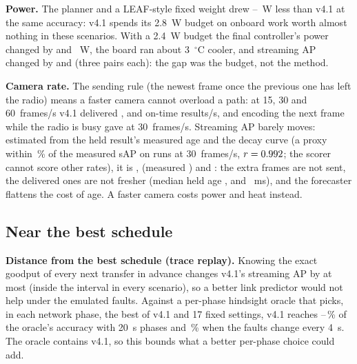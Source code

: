 \documentclass[conference]{IEEEtran}
\begin{document}
\textbf{Power.} The planner and a LEAF-style fixed weight drew \BdLessWMin--\BdLessWMax~W less than v4.1 at the same
accuracy: v4.1 spends its 2.8~W budget on onboard work worth almost nothing in these scenarios. With a 2.4~W budget the
final controller's power changed by \BdBudgetWMis{} and \BdBudgetWMulti~W, the board ran about 3~$^\circ$C cooler, and
streaming AP changed by \BdBudgetSapMis{} and \BdBudgetSapMulti{} (three pairs each): the gap was the budget, not the
method.

\textbf{Camera rate.} The sending rule (the newest frame once the previous one has left the radio) means a faster camera
cannot overload a path: at 15, 30 and 60~frames/s v4.1 delivered \FrFifteenOn, \FrThirtyOn{} and \FrSixtyOn{} on-time
results/s, and encoding the next frame while the radio is busy gave \FrAheadOn{} at 30~frames/s. Streaming AP barely
moves: estimated from the held result's measured age and the decay curve (a proxy within \FrProxyErr\,\% of the
measured sAP on \FrProxyRuns{} runs at 30~frames/s, $r = 0.992$; the scorer cannot score other rates), it is
\FrFifteenSap, \FrThirtySap{} (measured \FrThirtyMeas) and \FrSixtySap: the extra frames are not sent, the delivered
ones are not fresher (median held age \FrFifteenAge, \FrThirtyAge{} and \FrSixtyAge~ms), and the forecaster flattens
the cost of age. A faster camera costs power and heat instead.

\subsection{Near the best schedule}\label{sec:best}\label{sec:planner}
\textbf{Distance from the best schedule (trace replay).} Knowing the exact goodput of every next transfer in advance
changes v4.1's streaming AP by at most \ClairMax{} (inside the interval in every scenario), so a better link predictor
would not help under the emulated faults. Against a per-phase hindsight oracle that picks, in each network phase, the best of v4.1 and 17 fixed settings, v4.1
reaches \OracleShareMin--\OracleShareMax\,\% of the oracle's accuracy with 20~s phases and \OracleShareRandom\,\% when
the faults change every 4~s. The oracle contains v4.1, so this bounds what a better per-phase choice could add.
\end{document}
